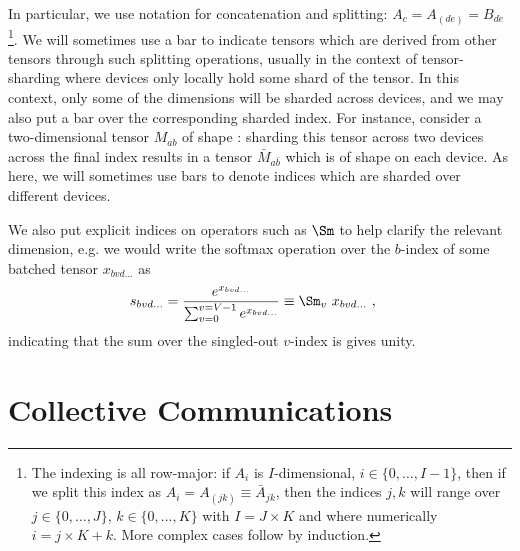 In particular, we use  notation for concatenation and splitting: $ A _{ c } = A _{
    (de) }= B _{ de } $\footnote{The indexing is all row-major: if $ A _{ i } $ is $
        I$-dimensional, $ i \in \{0, \ldots, I-1\} $, then if we split this index as $ A _{ i } = A
        _{ (jk) } \equiv \bar{A} _{ jk } $, then the indices $ j, k $ will range over $ j \in \{0,
    \ldots , J\} $, $ k\in \{0, \ldots , K\} $ with $ I =J \times K $ and where numerically $ i = j
\times K + k $. More complex cases follow by induction.}. We will sometimes use a bar to indicate
tensors which  are derived from other tensors through such splitting operations, usually in the
context of tensor-sharding where devices only locally hold some shard of the tensor. In this
context, only some of the dimensions will be sharded across devices, and we may also put a bar over
the corresponding sharded index. For instance, consider a two-dimensional tensor $ M _{ ab } $ of
shape : sharding this tensor across two devices across the final index
results in a tensor $ \bar{M}_{ a \bar{b} } $ which is of shape  on
each device. As here, we will sometimes use bars to denote indices which are sharded over different
devices.

We also put explicit indices on operators such as $ \Sm $ to help clarify the relevant
dimension, e.g. we would write the softmax operation over the $ b $-index of some batched
tensor $ x _{ bvd\ldots } $ as
\begin{align}
	s _{ bvd\ldots } & = \frac{ e^{ x _{ bv d\ldots}  } }{ \sum _{ v = 0 } ^{  v= V-1 } e^{ x _{
						bvd\ldots } } } \equiv
	\Sm _{ v } \ x _{ bvd\ldots }
	\ , \label{app_eq_einstein_softmax}
\end{align}
indicating that the sum over the singled-out $ v $-index is gives unity.

\section{Collective Communications \label{app_collective_communications} }

